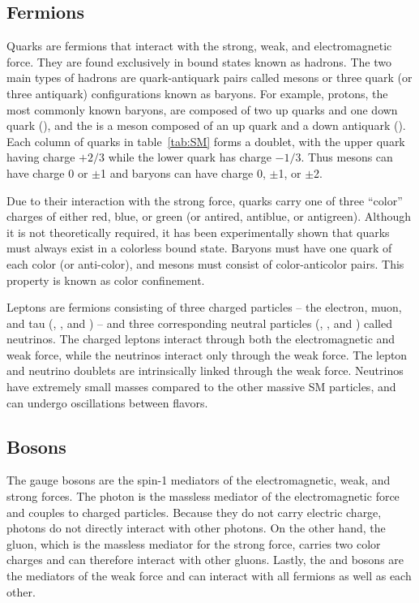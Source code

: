 \subsection{Fermions} \label{sec:sm_quarks}
Quarks are fermions that interact with the strong, weak, and electromagnetic force. They are found exclusively in bound states known as hadrons. The two main types of hadrons are quark-antiquark pairs called mesons or three quark (or three antiquark) configurations known as baryons. For example, protons, the most commonly known baryons, are composed of two up quarks and one down quark (\PQuns\PQuns\PQdns), and the \PGpp is a meson composed of an up quark and a down antiquark (\PQuns\PAQdns). Each column of quarks in table~\ref{tab:SM} forms a doublet, with the upper quark having charge $+2/3$ while the lower quark has charge $-1/3$. Thus mesons can have charge 0 or $\pm$1 and baryons can have charge 0, $\pm$1, or $\pm$2.

Due to their interaction with the strong force, quarks carry one of three ``color'' charges of either red, blue, or green (or antired, antiblue, or antigreen). Although it is not theoretically required, it has been experimentally shown that quarks must always exist in a colorless bound state. Baryons must have one quark of each color (or anti-color), and mesons must consist of color-anticolor pairs. This property is known as color confinement.

Leptons are fermions consisting of three charged particles -- the electron, muon, and tau (\Pe, \PGm, and \PGt) -- and three corresponding neutral particles (\PGne, \PGnGm, and \PGnGt) called neutrinos. The charged leptons interact through both the electromagnetic and weak force, while the neutrinos interact only through the weak force. The lepton and neutrino doublets are intrinsically linked through the weak force. Neutrinos have extremely small masses compared to the other massive SM particles, and can undergo oscillations between flavors.

\subsection{Bosons} \label{sec:sm_bosons}
The gauge bosons are the spin-1 mediators of the electromagnetic, weak, and strong forces. The photon is the massless mediator of the electromagnetic force and couples to charged particles. Because they do not carry electric charge, photons do not directly interact with other photons. On the other hand, the gluon, which is the massless mediator for the strong force, carries two color charges and can therefore interact with other gluons. Lastly, the \PZ and \PWpm bosons are the mediators of the weak force and can interact with all fermions as well as each other.

